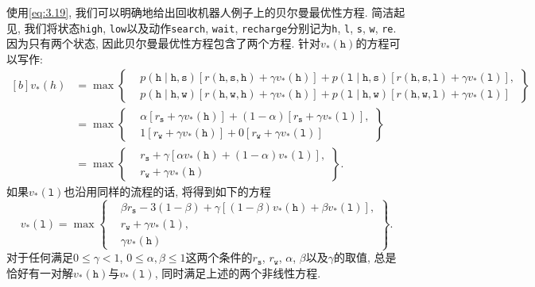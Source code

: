 \begin{exam}[回收机器人问题上的贝尔曼最优性方程]
使用\eqref{eq:3.19}, 我们可以明确地给出回收机器人例子上的贝尔曼最优性方程. 简洁起见, 我们将状态\texttt{high}, \texttt{low}以及动作\texttt{search}, \texttt{wait}, \texttt{recharge}分别记为\texttt{h}, \texttt{l}, \texttt{s}, \texttt{w}, \texttt{re}. 因为只有两个状态, 因此贝尔曼最优性方程包含了两个方程. 针对$v_*(\mathtt{h})$的方程可以写作:
\begin{equation*}
\newcommand{\tth}{\mathtt{h}}
\newcommand{\tts}{\mathtt{s}}
\newcommand{\ttl}{\mathtt{l}}
\newcommand{\ttw}{\mathtt{w}}
\begin{aligned}[b]
v_*(h) &= \max \left.
\begin{cases}
&p(\tth \mid \tth, \tts) [r(\tth, \tts, \tth) + \gamma v_*(\tth)] + p(\ttl \mid \tth, \tts)[r(\tth, \tts, \ttl) + \gamma v_*(\ttl)], \\
&p(\tth \mid \tth, \ttw) [r(\tth, \ttw, \tth) + \gamma v_*(\tth)] + p(\ttl \mid \tth, \ttw)[r(\tth, \ttw, \ttl) + \gamma v_*(\ttl)]
\end{cases} \right\} \\
&= \max \left.
\begin{cases}
&\alpha [r_\tts + \gamma v_*(\tth)] + (1 - \alpha)[r_\tts + \gamma v_*(\ttl)], \\
&1[r_\ttw + \gamma v_*(\tth)] + 0[r_\ttw + \gamma v_*(\ttl)]
\end{cases} \right\} \\
&=\max \left.
\begin{cases}
&r_\tts + \gamma[\alpha v_*(\tth) + (1 - \alpha)v_*(\ttl)], \\
&r_\ttw + \gamma v_*(\tth)
\end{cases} \right\}.
\end{aligned}
\end{equation*}
如果$v_*(\mathtt{l})$也沿用同样的流程的话, 将得到如下的方程
\begin{equation*}
\newcommand{\tth}{\mathtt{h}}
\newcommand{\tts}{\mathtt{s}}
\newcommand{\ttl}{\mathtt{l}}
\newcommand{\ttw}{\mathtt{w}}
v_*(\ttl) = \max \left.
\begin{cases}
&\beta r_\tts - 3(1 - \beta) + \gamma [(1 - \beta)v_*(\tth) + \beta v_*(\ttl)], \\
&r_\ttw + \gamma v_*(\ttl), \\
&\gamma v_*(\tth)
\end{cases} \right\}.
\end{equation*}
对于任何满足$0 \leq \gamma < 1$, $0 \leq \alpha, \beta \leq 1$这两个条件的$r_\mathtt{s}$, $r_\mathtt{w}$, $\alpha$, $\beta$以及$\gamma$的取值, 总是恰好有一对解$v_*(\mathtt{h})$与$v_*(\mathtt{l})$, 同时满足上述的两个非线性方程.
\end{exam}

